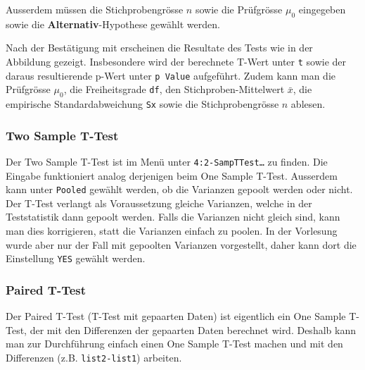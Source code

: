 \documentclass[a4paper,11pt,notitlepage,halfparskip,headsepline,normalheadings,twoside]{scrartcl}
\newlength{\tikey}
\newcommand{\keystroke}[1]{\settowidth{\tikey}{\scriptsize #1}\psframebox[framearc=0.2]{\parbox{\tikey}{\scriptsize\textsf{#1}}}}
\begin{document}
Ausserdem müssen die Stichprobengrösse $n$ sowie die Prüfgrösse $\mu_0$
eingegeben sowie die \textbf{Alternativ}-Hypothese gewählt werden.

\begin{window}
Nach der Bestätigung mit \keystroke{ENTER} erscheinen die Resultate des Tests
wie in der Abbildung gezeigt. Insbesondere wird der berechnete T-Wert unter
\texttt{t} sowie der daraus resultierende p-Wert unter \texttt{p Value}
aufgeführt. Zudem kann man die Prüfgrösse $\mu_0$, die Freiheitsgrade
\texttt{df}, den Stichproben-Mittelwert $\bar{x}$, die empirische
Standardabweichung \texttt{Sx} sowie die Stichprobengrösse $n$ ablesen.
\end{window}

\subsubsection{Two Sample T-Test}
Der Two Sample T-Test ist im Menü \keystroke{F6} unter
\texttt{4:2-SampTTest\ldots} zu finden. Die Eingabe funktioniert analog
derjenigen beim One Sample T-Test. Ausserdem kann unter \texttt{Pooled} gewählt
werden, ob die Varianzen gepoolt werden oder nicht. Der T-Test verlangt als
Voraussetzung gleiche Varianzen, welche in der Teststatistik dann gepoolt
werden. Falls die Varianzen nicht gleich sind, kann man dies korrigieren, statt
die Varianzen einfach zu poolen. In der Vorlesung wurde aber nur der Fall mit
gepoolten Varianzen vorgestellt, daher kann dort die Einstellung \texttt{YES}
gewählt werden.

\subsubsection{Paired T-Test}
Der Paired T-Test (T-Test mit gepaarten Daten) ist eigentlich ein One Sample
T-Test, der mit den Differenzen der gepaarten Daten berechnet wird. Deshalb kann
man zur Durchführung einfach einen One Sample T-Test machen und mit den
Differenzen (z.B. \texttt{list2-list1}) arbeiten.
\end{document}
